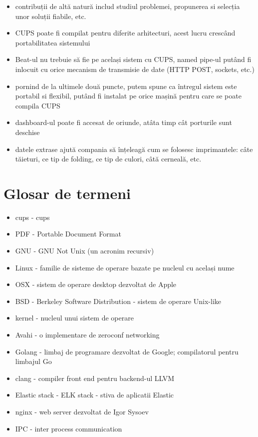 \documentclass[a4paper, 12pt, twoside]{report}
\begin{document}
{\begin{itemize}
		\subitem învățarea tehnologiilor, conceptelor, limbajelor de programare aferente realizării fiecarui din punctele anterior menționate
	\item contribuții de altă natură includ studiul problemei, propunerea si selecția unor soluții fiabile, etc.
	\item CUPS poate fi compilat pentru diferite arhitecturi, acest lucru crescând portabilitatea sistemului
	\item Beat-ul nu trebuie să fie pe același sistem cu CUPS, named pipe-ul putând fi inlocuit cu orice mecanism de transmisie de date (HTTP POST, sockets, etc.)
	\item pornind de la ultimele două puncte, putem spune ca întregul sistem este portabil si flexibil, putând fi instalat pe orice mașină pentru care se poate compila CUPS
	\item dashboard-ul poate fi accesat de oriunde, atâta timp cât porturile sunt deschise
	\item datele extrase ajută compania să înțeleagă cum se folosesc imprimantele: câte tăieturi, ce tip de folding, ce tip de culori, câtă cerneală, etc.
\end{itemize}

\chapter{Glosar de termeni}
\begin{itemize}
\item \acrshort{cups} - \acrlong{cups}
\item PDF - Portable Document Format
\item GNU - GNU Not Unix (un acronim recursiv)
\item Linux - familie de sisteme de operare bazate pe nucleul cu același nume
\item OSX - sistem de operare desktop dezvoltat de Apple
\item BSD - Berkeley Software Distribution - sistem de operare Unix-like
\item kernel - nucleul unui sistem de operare
\item Avahi - o implementare de zeroconf networking
\item Golang - limbaj de programare dezvoltat de Google; compilatorul pentru limbajul Go
\item clang - compiler front end pentru backend-ul LLVM
\item Elastic stack - ELK stack - stiva de aplicatii Elastic
\item nginx - web server dezvoltat de Igor Sysoev
\item IPC - inter process communication
\end{itemize}

}
\end{document}
